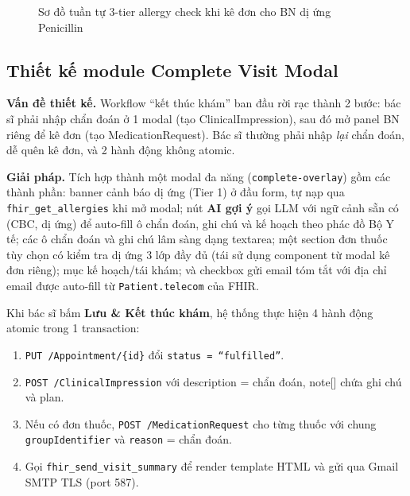 \documentclass[a4paper,13pt,3p,oneside]{report}
\theoremstyle{definition}
\theoremstyle{remark}
\theoremstyle{definition}
\begin{document}
\begin{figure}[H]
\caption{Sơ đồ tuần tự 3-tier allergy check khi kê đơn cho BN dị ứng Penicillin}
\label{fig:seq-flow-rx}
\end{figure}

\subsection{Thiết kế module Complete Visit Modal}

\textbf{Vấn đề thiết kế.} Workflow ``kết thúc khám'' ban đầu rời rạc thành 2 bước: bác sĩ phải nhập chẩn đoán ở 1 modal (tạo ClinicalImpression), sau đó mở panel BN riêng để kê đơn (tạo MedicationRequest). Bác sĩ thường phải nhập \textit{lại} chẩn đoán, dễ quên kê đơn, và 2 hành động không atomic.

\textbf{Giải pháp.} Tích hợp thành một modal đa năng (\texttt{complete-overlay}) gồm các thành phần: banner cảnh báo dị ứng (Tier 1) ở đầu form, tự nạp qua \texttt{fhir\_get\_allergies} khi mở modal; nút \textbf{AI gợi ý} gọi LLM với ngữ cảnh sẵn có (CBC, dị ứng) để auto-fill ô chẩn đoán, ghi chú và kế hoạch theo phác đồ Bộ Y tế; các ô chẩn đoán và ghi chú lâm sàng dạng textarea; một section đơn thuốc tùy chọn có kiểm tra dị ứng 3 lớp đầy đủ (tái sử dụng component từ modal kê đơn riêng); mục kế hoạch/tái khám; và checkbox gửi email tóm tắt với địa chỉ email được auto-fill từ \texttt{Patient.telecom} của FHIR.

Khi bác sĩ bấm \textbf{Lưu \& Kết thúc khám}, hệ thống thực hiện 4 hành động atomic trong 1 transaction:
\begin{enumerate}
  \item \texttt{PUT /Appointment/\{id\}} đổi \texttt{status = ``fulfilled''}.
  \item \texttt{POST /ClinicalImpression} với description = chẩn đoán, note[] chứa ghi chú và plan.
  \item Nếu có đơn thuốc, \texttt{POST /MedicationRequest} cho từng thuốc với chung \texttt{groupIdentifier} và \texttt{reason} = chẩn đoán.
  \item Gọi \texttt{fhir\_send\_visit\_summary} để render template HTML và gửi qua Gmail SMTP TLS (port 587).
\end{enumerate}
\end{document}

